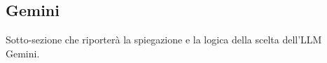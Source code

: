 \subsection{Gemini}

Sotto-sezione che riporterà la spiegazione e la logica della scelta dell'LLM Gemini.